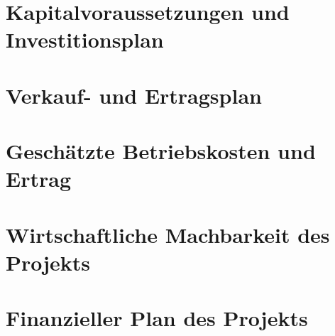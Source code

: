 \chapter{Kapitalvoraussetzungen und Investitionsplan}

\chapter{Verkauf- und Ertragsplan}

\chapter{Geschätzte Betriebskosten und Ertrag}

\chapter{Wirtschaftliche Machbarkeit des Projekts}

\chapter{Finanzieller Plan des Projekts}

